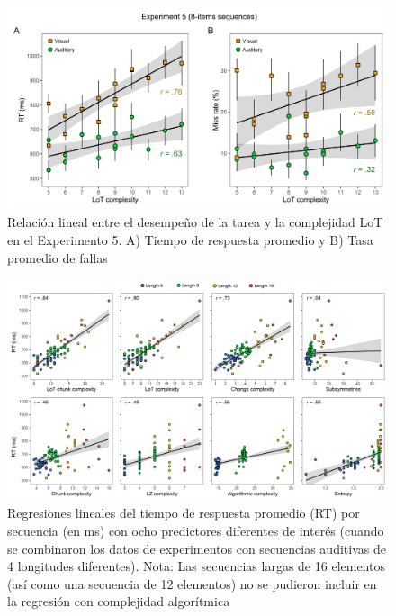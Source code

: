\begin{figure}[t!]
      \includegraphics[scale=0.8]{figuras/plosbio/journal.pcbi.1008598.s008.png}
      \centering
      \caption{Relación lineal entre el desempeño de la tarea y la complejidad LoT en el Experimento 5. A) Tiempo de respuesta promedio y B) Tasa promedio de fallas}
      \label{PlosBIO-S8}
\end{figure}

\begin{figure}[t!]
      \includegraphics[scale=0.8]{figuras/plosbio/journal.pcbi.1008598.s009.png}
      \centering
      \caption{ Regresiones lineales del tiempo de respuesta promedio (RT) por secuencia (en ms) con ocho predictores diferentes de interés (cuando se combinaron los datos de experimentos con secuencias auditivas de 4 longitudes diferentes). Nota: Las secuencias largas de 16 elementos (así como una secuencia de 12 elementos) no se pudieron incluir en la regresión con complejidad algorítmica}
      \label{PlosBIO-S9}
\end{figure}

